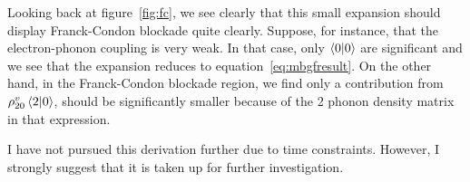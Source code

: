 Looking back at figure~\ref{fig:fc}, we see clearly that this small expansion should display Franck-Condon blockade quite clearly. Suppose, for instance, that the electron-phonon coupling is very weak. In that case, only $\braket{0|0}$ are significant and we see that the expansion reduces to equation~\ref{eq:mbgfresult}. On the other hand, in the Franck-Condon blockade region, we find only a contribution from $\rho^v_{20} \braket{2|0}$, should be significantly smaller because of the 2 phonon density matrix in that expression.

I have not pursued this derivation further due to time constraints. However, I strongly suggest that it is taken up for further investigation.



\clearpage
{}